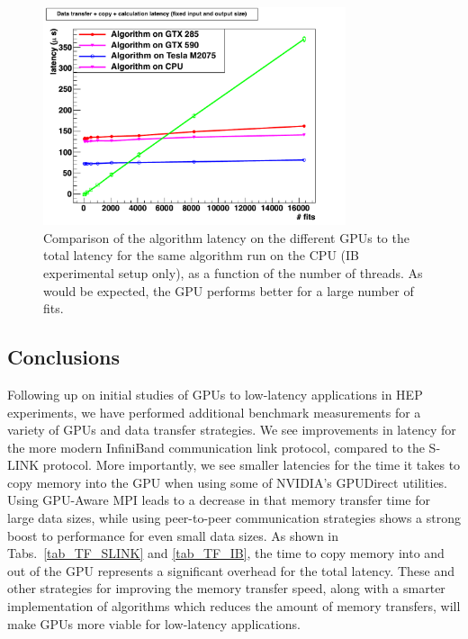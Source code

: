 \documentclass[journal]{IEEEtran}
\begin{document}
\begin{figure}[!h]
  \centering
  \includegraphics[width=3.5in]{figures/TF_SLINK_IB_fixedSize_CPUvsGPU_noDT}
  \caption{Comparison of the algorithm latency on the different GPUs 
to the total latency for the same algorithm run on the CPU (IB 
experimental setup only), as a function of the number of threads.  As would
be expected, the GPU performs better for a large number of fits.}
  \label{fig_TF_SLINK_IB_fixedSize_CPUvsGPU}
\end{figure}

%
\subsection{Conclusions}

Following up on initial studies of GPUs to low-latency applications in HEP experiments, 
we have performed additional benchmark measurements for a variety of GPUs and data transfer 
strategies. We see improvements in latency for the more modern InfiniBand communication link 
protocol, compared to the S-LINK protocol. More importantly, we see smaller latencies for the time
it takes to copy memory into the GPU when using some of NVIDIA's GPUDirect utilities. Using GPU-Aware MPI
leads to a decrease in that memory transfer time for large data sizes, while using peer-to-peer communication
strategies shows a strong boost to performance for even small data sizes. As shown in 
Tabs.~\ref{tab_TF_SLINK} and \ref{tab_TF_IB}, the time to copy memory into and out of the GPU represents a significant overhead 
for the total latency. These and other strategies for improving the memory transfer speed, along with a smarter implementation of 
algorithms which reduces the amount of memory transfers, will make GPUs more viable for low-latency applications.
\end{document}
